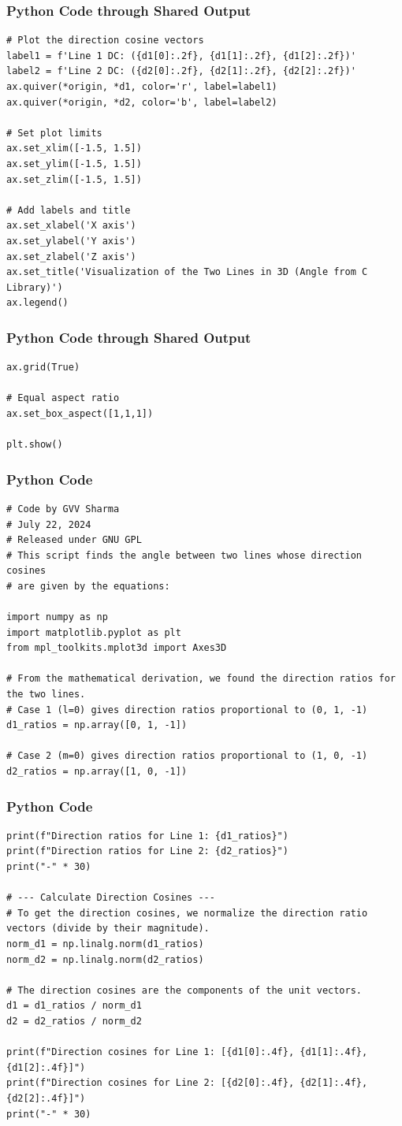 \documentclass{beamer}
\begin{document}
\begin{frame}[fragile]
\frametitle{Python Code through Shared Output}
\begin{lstlisting}
# Plot the direction cosine vectors
label1 = f'Line 1 DC: ({d1[0]:.2f}, {d1[1]:.2f}, {d1[2]:.2f})'
label2 = f'Line 2 DC: ({d2[0]:.2f}, {d2[1]:.2f}, {d2[2]:.2f})'
ax.quiver(*origin, *d1, color='r', label=label1)
ax.quiver(*origin, *d2, color='b', label=label2)

# Set plot limits
ax.set_xlim([-1.5, 1.5])
ax.set_ylim([-1.5, 1.5])
ax.set_zlim([-1.5, 1.5])

# Add labels and title
ax.set_xlabel('X axis')
ax.set_ylabel('Y axis')
ax.set_zlabel('Z axis')
ax.set_title('Visualization of the Two Lines in 3D (Angle from C Library)')
ax.legend()
\end{lstlisting}
\end{frame}  
\begin{frame}[fragile]
\frametitle{Python Code through Shared Output}
\begin{lstlisting}
ax.grid(True)

# Equal aspect ratio
ax.set_box_aspect([1,1,1])

plt.show()
\end{lstlisting}
\end{frame}  
\begin{frame}[fragile]
\frametitle{Python Code }
\begin{lstlisting}
# Code by GVV Sharma
# July 22, 2024
# Released under GNU GPL
# This script finds the angle between two lines whose direction cosines
# are given by the equations:

import numpy as np
import matplotlib.pyplot as plt
from mpl_toolkits.mplot3d import Axes3D

# From the mathematical derivation, we found the direction ratios for the two lines.
# Case 1 (l=0) gives direction ratios proportional to (0, 1, -1)
d1_ratios = np.array([0, 1, -1])

# Case 2 (m=0) gives direction ratios proportional to (1, 0, -1)
d2_ratios = np.array([1, 0, -1])

\end{lstlisting}
\end{frame}  
\begin{frame}[fragile]
\frametitle{Python Code }
\begin{lstlisting}
print(f"Direction ratios for Line 1: {d1_ratios}")
print(f"Direction ratios for Line 2: {d2_ratios}")
print("-" * 30)

# --- Calculate Direction Cosines ---
# To get the direction cosines, we normalize the direction ratio vectors (divide by their magnitude).
norm_d1 = np.linalg.norm(d1_ratios)
norm_d2 = np.linalg.norm(d2_ratios)

# The direction cosines are the components of the unit vectors.
d1 = d1_ratios / norm_d1
d2 = d2_ratios / norm_d2

print(f"Direction cosines for Line 1: [{d1[0]:.4f}, {d1[1]:.4f}, {d1[2]:.4f}]")
print(f"Direction cosines for Line 2: [{d2[0]:.4f}, {d2[1]:.4f}, {d2[2]:.4f}]")
print("-" * 30)

\end{lstlisting}
\end{frame}  
\end{document}
